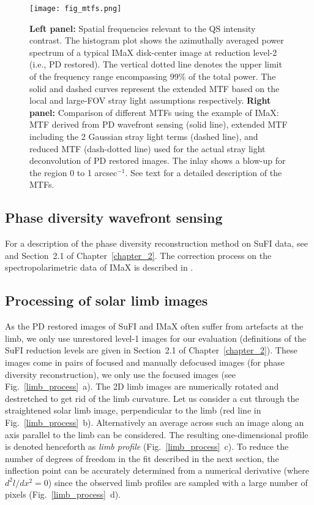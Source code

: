 \documentclass[goettingen, gauss, print]{thesis}
\begin{document}
\begin{figure}
\centering
\texttt{[image: fig\_mtfs.png]}
\caption{\textbf{Left panel:} Spatial frequencies relevant to the QS intensity contrast. The histogram plot shows the azimuthally averaged power spectrum of a typical IMaX disk-center image at reduction level-2 (i.e., PD restored). The vertical dotted line denotes the upper limit of the frequency range encompassing 99\% of the total power. The solid and dashed curves represent the extended MTF based on the local and large-FOV stray light assumptions respectively. \textbf{Right panel:} Comparison of different MTFs using the example of IMaX: MTF derived from PD wavefront sensing (solid line), extended MTF including the 2 Gaussian stray light terms (dashed line), and reduced MTF (dash-dotted line) used for the actual stray light deconvolution of PD restored images. The inlay shows a blow-up for the region 0 to 1 arcsec$^{-1}$. See text for a detailed description of the MTFs.\label{fig:mtf}}
\end{figure}


\subsection{Phase diversity wavefront sensing} \label{sec:psf_pd}

For a description of the phase diversity reconstruction method on SuFI data, see \cite{hirzberger_quiet-sun_2010, hirzberger_performance_2011} and Section~2.1 of Chapter~\ref{chapter_2}. The correction process on the spectropolarimetric data of IMaX is described in \cite{martinezpillet_imaging_2011}.

\subsection{Processing of solar limb images} \label{process}
As the PD restored images of SuFI and IMaX often suffer from artefacts at the limb, we only use unrestored level-1 images for our evaluation (definitions of the SuFI reduction levels are given in Section~2.1 of Chapter~\ref{chapter_2}). These images come in pairs of focused and manually defocused images (for phase diversity reconstruction), we only use the focused images (see Fig.~\ref{limb_process}~a). The 2D limb images are numerically rotated and destretched to get rid of the limb curvature. Let us consider a cut through the straightened solar limb image, perpendicular to the limb (red line in Fig.~\ref{limb_process}~b). Alternatively an average across such an image along an axis parallel to the limb can be considered. The resulting one-dimensional profile is denoted henceforth as \emph{limb profile} (Fig.~\ref{limb_process}~c).  
To reduce the number of degrees of freedom in the fit described in the next section, the inflection point can be accurately determined from a numerical derivative (where $d^2 l/ d x^2 = 0$) since the observed limb profiles are sampled with a large number of pixels (Fig.~\ref{limb_process}~d). 
\end{document}
